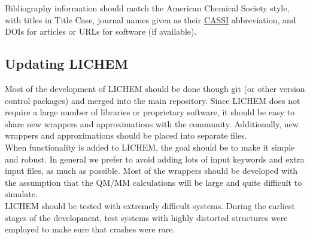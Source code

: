 \documentclass[12pt]{report}
\begin{document}
Bibliography information should match the American Chemical Society style,
with titles in Title Case, journal names given as their
\href{https://cassi.cas.org/search.jsp}{CASSI} abbreviation,
and DOIs for articles or URLs for software (if available).

\subsection{Updating LICHEM}

Most of the development of LICHEM should be done though git (or other version
control packages) and merged into the main repository.
Since LICHEM does not require a large number of libraries or proprietary
software, it should be easy to share new wrappers and approximations with the
community.
Additionally, new wrappers and approximations should be placed into separate
files. \\

When functionality is added to LICHEM, the goal should be to make it simple
and robust.
In general we prefer to avoid adding lots of input keywords and extra input
files, as much as possible.
Most of the wrappers should be developed with the assumption that the QM/MM
calculations will be large and quite difficult to simulate.\\



LICHEM should be tested with extremely difficult systems.
During the earliest stages of the development, test systems with highly
distorted structures were employed to make sure that crashes were rare. \\
\end{document}
